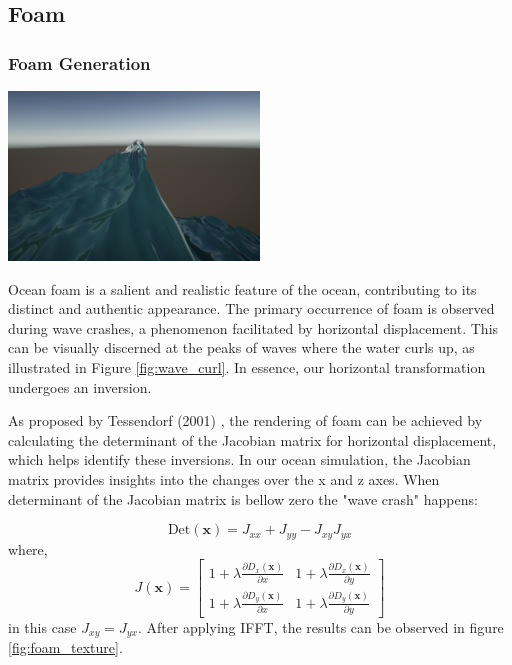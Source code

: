 \subsection{Foam}
\subsubsection{Foam Generation}
\begin{minipage}{1\textwidth}
    \centering
    \includegraphics[width=0.50\textwidth]{"images/wave_curl.png"}
    \label{fig:wave_curl}
\end{minipage}

Ocean foam is a salient and realistic feature of the ocean, contributing to its distinct and authentic appearance. The primary occurrence of foam is observed during wave crashes, a phenomenon facilitated by horizontal displacement. This can be visually discerned at the peaks of waves where the water curls up, as illustrated in Figure \ref{fig:wave_curl}. In essence, our horizontal transformation undergoes an inversion.

As proposed by Tessendorf (2001) \cite{tessendorf2001}, the rendering of foam can be achieved by calculating the determinant of the Jacobian matrix for horizontal displacement, which helps identify these inversions. In our ocean simulation, the Jacobian matrix provides insights into the changes over the x and z axes. When determinant of the Jacobian matrix is bellow zero the "wave crash" happens:

\begin{equation}
    \text{Det}(\mathbf{x}) = J_{xx} + J_{yy} - J_{xy} J_{yx}
\end{equation}
where,
\begin{equation}
    J(\mathbf{x}) = 
    \begin{bmatrix} 
        1 + \lambda\frac{\partial D_x(\mathbf{x})}{\partial x} & 1 + \lambda\frac{\partial D_x(\mathbf{x})}{\partial y} \\
        1 + \lambda\frac{\partial D_y(\mathbf{x})}{\partial x} & 1 + \lambda\frac{\partial D_y(\mathbf{x})}{\partial y} 
    \end{bmatrix} 
\end{equation}
in this case $J_{xy} = J_{yx}$. After applying IFFT, the results can be observed in figure \ref{fig:foam_texture}.


